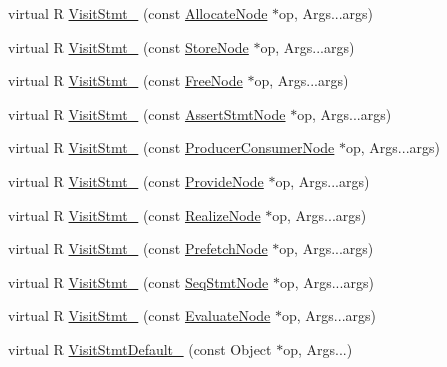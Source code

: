 \begin{DoxyCompactItemize}
\item 
virtual R \hyperlink{classtvm_1_1tir_1_1StmtFunctor_3_01R_07const_01Stmt_01_6n_00_01Args_8_8_8args_08_4_adf37d742ed06eb5e109f1a15e1a826fa}{Visit\+Stmt\+\_\+} (const \hyperlink{classtvm_1_1tir_1_1AllocateNode}{Allocate\+Node} $\ast$op, Args...\+args)
\item 
virtual R \hyperlink{classtvm_1_1tir_1_1StmtFunctor_3_01R_07const_01Stmt_01_6n_00_01Args_8_8_8args_08_4_ae0cc8034e586408c25ffcb7c43684f0f}{Visit\+Stmt\+\_\+} (const \hyperlink{classtvm_1_1tir_1_1StoreNode}{Store\+Node} $\ast$op, Args...\+args)
\item 
virtual R \hyperlink{classtvm_1_1tir_1_1StmtFunctor_3_01R_07const_01Stmt_01_6n_00_01Args_8_8_8args_08_4_a8c1509214a19114bd826e6cc4aaee936}{Visit\+Stmt\+\_\+} (const \hyperlink{classtvm_1_1tir_1_1FreeNode}{Free\+Node} $\ast$op, Args...\+args)
\item 
virtual R \hyperlink{classtvm_1_1tir_1_1StmtFunctor_3_01R_07const_01Stmt_01_6n_00_01Args_8_8_8args_08_4_a38d0dfd90e64c092bb4687310c193f5a}{Visit\+Stmt\+\_\+} (const \hyperlink{classtvm_1_1tir_1_1AssertStmtNode}{Assert\+Stmt\+Node} $\ast$op, Args...\+args)
\item 
virtual R \hyperlink{classtvm_1_1tir_1_1StmtFunctor_3_01R_07const_01Stmt_01_6n_00_01Args_8_8_8args_08_4_ab7907012785d8468b36325a86f3d3439}{Visit\+Stmt\+\_\+} (const \hyperlink{classtvm_1_1tir_1_1ProducerConsumerNode}{Producer\+Consumer\+Node} $\ast$op, Args...\+args)
\item 
virtual R \hyperlink{classtvm_1_1tir_1_1StmtFunctor_3_01R_07const_01Stmt_01_6n_00_01Args_8_8_8args_08_4_af79c39839087be7af2b0b7d5ecc546b0}{Visit\+Stmt\+\_\+} (const \hyperlink{classtvm_1_1tir_1_1ProvideNode}{Provide\+Node} $\ast$op, Args...\+args)
\item 
virtual R \hyperlink{classtvm_1_1tir_1_1StmtFunctor_3_01R_07const_01Stmt_01_6n_00_01Args_8_8_8args_08_4_a7c206781866bf85effcaac1d597e84d2}{Visit\+Stmt\+\_\+} (const \hyperlink{classtvm_1_1tir_1_1RealizeNode}{Realize\+Node} $\ast$op, Args...\+args)
\item 
virtual R \hyperlink{classtvm_1_1tir_1_1StmtFunctor_3_01R_07const_01Stmt_01_6n_00_01Args_8_8_8args_08_4_aa9f502eaad37f47adb66986a2aed633c}{Visit\+Stmt\+\_\+} (const \hyperlink{classtvm_1_1tir_1_1PrefetchNode}{Prefetch\+Node} $\ast$op, Args...\+args)
\item 
virtual R \hyperlink{classtvm_1_1tir_1_1StmtFunctor_3_01R_07const_01Stmt_01_6n_00_01Args_8_8_8args_08_4_a0eabde632e5d5fabc3e50b38a0ecded8}{Visit\+Stmt\+\_\+} (const \hyperlink{classtvm_1_1tir_1_1SeqStmtNode}{Seq\+Stmt\+Node} $\ast$op, Args...\+args)
\item 
virtual R \hyperlink{classtvm_1_1tir_1_1StmtFunctor_3_01R_07const_01Stmt_01_6n_00_01Args_8_8_8args_08_4_a5632fe5dfbaafffc4578e7beda8c52be}{Visit\+Stmt\+\_\+} (const \hyperlink{classtvm_1_1tir_1_1EvaluateNode}{Evaluate\+Node} $\ast$op, Args...\+args)
\item 
virtual R \hyperlink{classtvm_1_1tir_1_1StmtFunctor_3_01R_07const_01Stmt_01_6n_00_01Args_8_8_8args_08_4_aeb08feaffc3f8fb6f6c379ccce9bbd45}{Visit\+Stmt\+Default\+\_\+} (const Object $\ast$op, Args...)
\end{DoxyCompactItemize}


